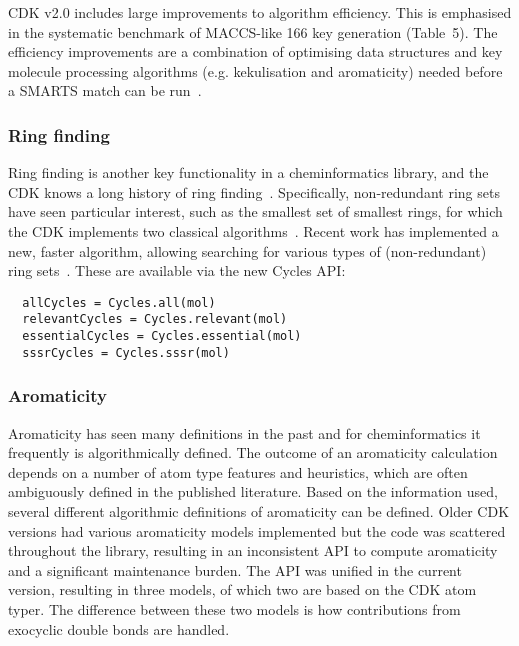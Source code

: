 \documentclass[doublespacing]{bmcart}
\def \cdkversion {v2.0}
\begin{document}
CDK \cdkversion{} includes large improvements to algorithm
efficiency. This is emphasised in the systematic benchmark
of MACCS-like 166 key generation (Table~5). The efficiency improvements
are a combination of optimising data structures and key molecule processing
algorithms (e.g. kekulisation and aromaticity) needed before a SMARTS
match can be run~\cite{MayBlog2013a,MayBlog2013b,May2015}.

\subsubsection*{Ring finding}

Ring finding is another key functionality in a cheminformatics library, and
the CDK knows a long history of ring finding~\cite{Berger2004,May2014}. Specifically,
non-redundant ring sets have seen particular interest,
such as the smallest set of smallest rings, for which the CDK
implements two classical algorithms~\cite{Figueras1996,Berger2004}.
Recent work has implemented a new, faster algorithm, allowing
searching for various types of (non-redundant) ring
sets~\cite{May2014}. These are available via the new Cycles API:

\vspace{0.2cm}
\begin{verbatim}
  allCycles = Cycles.all(mol)
  relevantCycles = Cycles.relevant(mol)
  essentialCycles = Cycles.essential(mol)
  sssrCycles = Cycles.sssr(mol)
\end{verbatim}
\vspace{0.2cm}

\subsubsection*{Aromaticity}

Aromaticity has seen many definitions in the past and for
cheminformatics it frequently is algorithmically defined. The outcome
of an aromaticity calculation depends on a number of atom type
features and heuristics, which are often ambiguously defined in the
published literature. Based on the information used, several different
algorithmic definitions of aromaticity can be defined. Older CDK
versions had various aromaticity models implemented but the code was scattered
throughout the library, resulting in an inconsistent API
to compute aromaticity and a significant maintenance
burden.  The API was unified in the current version, resulting in three
models, of which two are based on the CDK atom typer. The difference
between these two models is how contributions from exocyclic double
bonds are handled.
\end{document}

